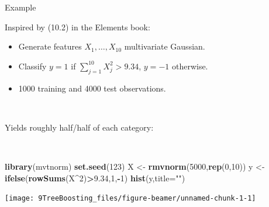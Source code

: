\documentclass[
  10pt,
  ignorenonframetext,
]{beamer}
\newenvironment{Shaded}{\begin{snugshade}}{\end{snugshade}}
\newcommand{\AttributeTok}[1]{\textcolor[rgb]{0.13,0.29,0.53}{#1}}
\newcommand{\DecValTok}[1]{\textcolor[rgb]{0.00,0.00,0.81}{#1}}
\newcommand{\FloatTok}[1]{\textcolor[rgb]{0.00,0.00,0.81}{#1}}
\newcommand{\FunctionTok}[1]{\textcolor[rgb]{0.13,0.29,0.53}{\textbf{#1}}}
\newcommand{\NormalTok}[1]{#1}
\newcommand{\OtherTok}[1]{\textcolor[rgb]{0.56,0.35,0.01}{#1}}
\newcommand{\SpecialCharTok}[1]{\textcolor[rgb]{0.81,0.36,0.00}{\textbf{#1}}}
\newcommand{\StringTok}[1]{\textcolor[rgb]{0.31,0.60,0.02}{#1}}
\providecommand{\tightlist}{%
  \setlength{\itemsep}{0pt}\setlength{\parskip}{0pt}}
\begin{document}
\begin{frame}[fragile]
\begin{block}{Example}
\protect\hypertarget{example}{}
\(~\)

Inspired by (10.2) in the Elements book:

\vspace{2mm}

\begin{itemize}
\tightlist
\item
  Generate features \(X_1, \ldots, X_{10}\) multivariate Gaussian.
\item
  Classify \(y=1\) if \(\sum_{j=1}^{10}X_j^2 > 9.34\), \(y=-1\)
  otherwise.
\item
  1000 training and 4000 test observations.
\end{itemize}

\(~\)

Yields roughly half/half of each category:

\(~\)

\scriptsize
\centering

\begin{Shaded}
\begin{Highlighting}[]
\FunctionTok{library}\NormalTok{(mvtnorm)}
\FunctionTok{set.seed}\NormalTok{(}\DecValTok{123}\NormalTok{)}
\NormalTok{X }\OtherTok{\textless{}{-}} \FunctionTok{rmvnorm}\NormalTok{(}\DecValTok{5000}\NormalTok{,}\FunctionTok{rep}\NormalTok{(}\DecValTok{0}\NormalTok{,}\DecValTok{10}\NormalTok{))}
\NormalTok{y }\OtherTok{\textless{}{-}} \FunctionTok{ifelse}\NormalTok{(}\FunctionTok{rowSums}\NormalTok{(X}\SpecialCharTok{\^{}}\DecValTok{2}\NormalTok{)}\SpecialCharTok{\textgreater{}}\FloatTok{9.34}\NormalTok{,}\DecValTok{1}\NormalTok{,}\SpecialCharTok{{-}}\DecValTok{1}\NormalTok{)}
\FunctionTok{hist}\NormalTok{(y,}\AttributeTok{title=}\StringTok{""}\NormalTok{)}
\end{Highlighting}
\end{Shaded}

\texttt{[image: 9TreeBoosting\_files/figure-beamer/unnamed-chunk-1-1]}
\end{block}
\end{frame}
\end{document}
